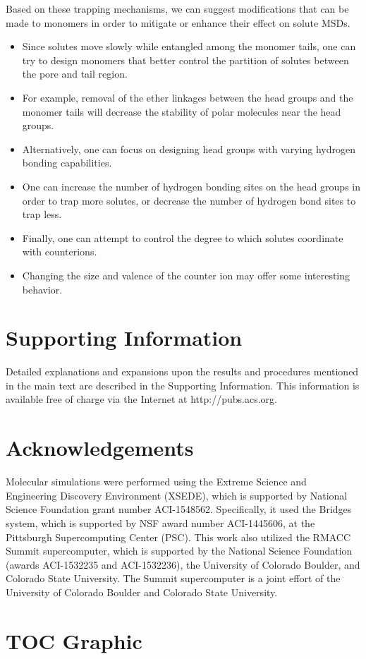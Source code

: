 \documentclass{article}
\begin{document}
  Based on these trapping mechanisms, we can suggest modifications that
  can be made to monomers in order to mitigate or enhance their effect on
  solute MSDs.
  \begin{itemize}
    \item Since solutes move slowly while entangled among the monomer tails, one can try to
    design monomers that better control the partition of solutes between the pore and
    tail region.
    \item For example, removal of the ether linkages between the head groups and the 
    monomer tails will decrease the stability of polar molecules near the head groups.
    \item Alternatively, one can focus on designing head groups with varying hydrogen 
    bonding capabilities.
    \item One can increase the number of hydrogen bonding sites on the head groups
    in order to trap more solutes, or decrease the number of hydrogen bond sites
    to trap less.
    \item Finally, one can attempt to control the degree to which solutes coordinate 
    with counterions.
    \item Changing the size and valence of the counter ion may offer some
    interesting behavior. 
  \end{itemize}
 
  \section*{Supporting Information}

  Detailed explanations and expansions upon the results and procedures mentioned in
  the main text are described in the Supporting Information. This information is
  available free of charge via the Internet at http://pubs.acs.org.

  \section*{Acknowledgements}

  Molecular simulations were performed using the Extreme Science and
  Engineering Discovery Environment (XSEDE), which is supported by National
  Science Foundation grant number ACI-1548562. Specifically, it used the Bridges
  system, which is supported by NSF award number ACI-1445606, at the Pittsburgh
  Supercomputing Center (PSC). This work also utilized the RMACC Summit supercomputer,
  which is supported by the National Science Foundation (awards ACI-1532235 and
  ACI-1532236), the University of Colorado Boulder, and Colorado State
  University. The Summit supercomputer is a joint effort of the University of
  Colorado Boulder and Colorado State University.

  \clearpage

  
  

  \newpage

  \section*{TOC Graphic}
\end{document}
